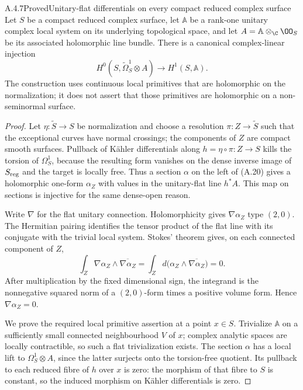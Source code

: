 \begin{statement}{A.4.7}{Proved}{Unitary-flat differentials on every compact reduced complex surface}
Let $S$ be a compact reduced complex surface, let $\mathbb A$ be a rank-one unitary complex local system on its underlying topological space, and let $A=\mathbb A\otimes_{\C}\OO_S$ be its associated holomorphic line bundle. There is a canonical complex-linear injection
\[
 H^0(S,\widetilde\Omega_S^1\otimes A)
       \longrightarrow H^1(S,\mathbb A).
 \tag{A.20}
\]
The construction uses continuous local primitives that are holomorphic on the normalization; it does not assert that those primitives are holomorphic on a non-seminormal surface.
\end{statement}
\begin{proof}
Let $\eta:\widetilde S\to S$ be normalization and choose a resolution $\pi:Z\to\widetilde S$ such that the exceptional curves have normal crossings; the components of $Z$ are compact smooth surfaces. Pullback of Kähler differentials along $h=\eta\circ\pi:Z\to S$ kills the torsion of $\Omega_S^1$, because the resulting form vanishes on the dense inverse image of $S_{\rm reg}$ and the target is locally free. Thus a section $\alpha$ on the left of (A.20) gives a holomorphic one-form $\alpha_Z$ with values in the unitary-flat line $h^*A$. This map on sections is injective for the same dense-open reason.

Write $\nabla$ for the flat unitary connection. Holomorphicity gives $\nabla\alpha_Z$ type $(2,0)$. The Hermitian pairing identifies the tensor product of the flat line with its conjugate with the trivial local system. Stokes' theorem gives, on each connected component of $Z$,
\[
 \int_Z \nabla\alpha_Z\wedge\overline{\nabla\alpha_Z}
 =\int_Z d\bigl(\alpha_Z\wedge\overline{\nabla\alpha_Z}\bigr)=0.
\]
After multiplication by the fixed dimensional sign, the integrand is the nonnegative squared norm of a $(2,0)$-form times a positive volume form. Hence $\nabla\alpha_Z=0$.

We prove the required local primitive assertion at a point $x\in S$. Trivialize $\mathbb A$ on a sufficiently small connected neighbourhood $V$ of $x$; complex analytic spaces are locally contractible, so such a flat trivialization exists. The section $\alpha$ has a local lift to $\Omega_S^1\otimes A$, since the latter surjects onto the torsion-free quotient. Its pullback to each reduced fibre of $h$ over $x$ is zero: the morphism of that fibre to $S$ is constant, so the induced morphism on Kähler differentials is zero.


\end{proof}
